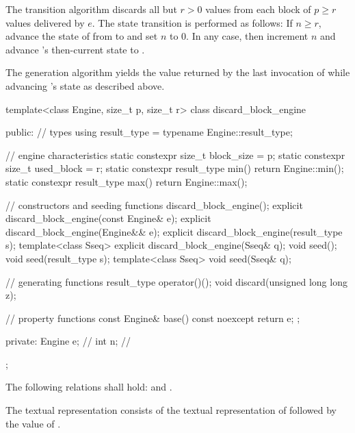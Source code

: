 \pnum
The transition algorithm%
%
discards all but $r > 0$ values
from each block of $p \geq r$ values delivered by $e$.
The state transition is performed as follows:
If $n \geq r$,
 advance the state of  from  to 
 and set $n$ to $0$.
In any case,
 then increment $n$
 and advance 's then-current state 
 to .

\pnum
The generation algorithm%
%
yields the value returned by the last invocation of 
 while advancing 's state as described above.

%
%
\begin{codeblock}
template<class Engine, size_t p, size_t r>
  class discard_block_engine {
  public:
    // types
    using result_type = typename Engine::result_type;

    // engine characteristics
    static constexpr size_t block_size = p;
    static constexpr size_t used_block = r;
    static constexpr result_type min() { return Engine::min(); }
    static constexpr result_type max() { return Engine::max(); }

    // constructors and seeding functions
    discard_block_engine();
    explicit discard_block_engine(const Engine& e);
    explicit discard_block_engine(Engine&& e);
    explicit discard_block_engine(result_type s);
    template<class Sseq> explicit discard_block_engine(Sseq& q);
    void seed();
    void seed(result_type s);
    template<class Sseq> void seed(Sseq& q);

    // generating functions
    result_type operator()();
    void discard(unsigned long long z);

    // property functions
    const Engine& base() const noexcept { return e; };

  private:
    Engine e;   // \expos
    int n;      // \expos
  };
\end{codeblock}

\pnum
The following relations shall hold:
and
  .

\pnum
The textual representation%
%
consists of
 the textual representation of 
followed by
 the value of .

